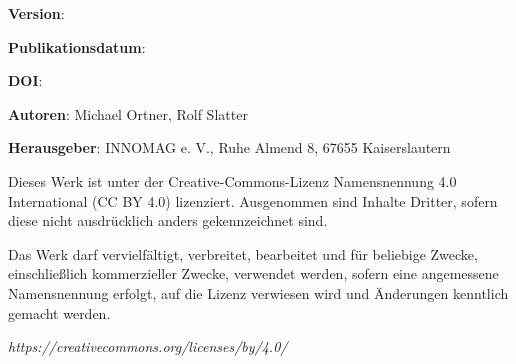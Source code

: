 \thispagestyle{empty}

\null
\vfill

\small

\textbf{Version}: \guidelineversion

\textbf{Publikationsdatum}: \guidelinedate

\textbf{DOI}: \guidelinedoi

\vspace{1.0cm}

\textbf{Autoren}: Michael Ortner, Rolf Slatter

\textbf{Herausgeber}: INNOMAG e. V., Ruhe Almend 8, 67655 Kaiserslautern

\vspace{1.0cm}

Dieses Werk ist unter der Creative-Commons-Lizenz Namensnennung 4.0 International (CC BY 4.0) lizenziert. Ausgenommen sind Inhalte Dritter, sofern diese nicht ausdrücklich anders gekennzeichnet sind.

Das Werk darf vervielfältigt, verbreitet, bearbeitet und für beliebige Zwecke, einschließlich kommerzieller Zwecke, verwendet werden, sofern eine angemessene Namensnennung erfolgt, auf die Lizenz verwiesen wird und Änderungen kenntlich gemacht werden.

\textit{https://creativecommons.org/licenses/by/4.0/}

\normalsize

\clearpage

